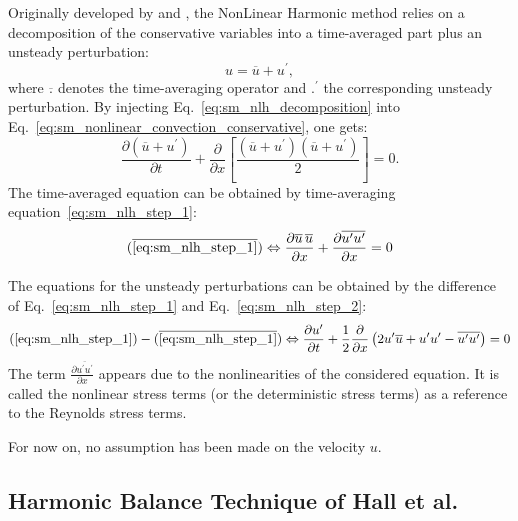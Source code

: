 Originally developed by \citet{He1998} and \citet{Ning1998}, the 
NonLinear Harmonic method
relies on a decomposition of the conservative variables into a
time-averaged part plus an unsteady perturbation:
\begin{equation}
	u = \overline{u} + u^\prime,
	\label{eq:sm_nlh_decomposition}
\end{equation}
where $\overline{.}$ denotes the time-averaging operator and
$.^\prime$ the corresponding unsteady perturbation.
By injecting Eq.~\ref{eq:sm_nlh_decomposition} into
Eq.~\ref{eq:sm_nonlinear_convection_conservative}, one gets:
\begin{equation}
	\frac{\partial \left( \overline{u} + u^\prime \right)}{\partial t} + 
	\frac{\partial}{\partial x} \left[\frac{
		\left( \overline{u} + u^\prime\right)
		\left( \overline{u} + u^\prime\right)}{2}\right] = 
	0.
	\label{eq:sm_nlh_step_1}
\end{equation}
The time-averaged equation can be obtained by time-averaging
equation~\ref{eq:sm_nlh_step_1}:
\begin{equation}
	(\overline{\ref{eq:sm_nlh_step_1}})
	\Leftrightarrow
	\frac{\partial \overline{u} \, \overline{u}}{\partial x} +
	\frac{\partial \overline{u^\prime u^\prime}}{\partial x} =
	0
	\label{eq:sm_nlh_step_2}
\end{equation}

The equations for the unsteady perturbations can be obtained by
the difference of Eq.~\ref{eq:sm_nlh_step_1}
and Eq.~\ref{eq:sm_nlh_step_2}:
\begin{equation}
	(\ref{eq:sm_nlh_step_1}) - (\overline{\ref{eq:sm_nlh_step_1}})
	\Leftrightarrow
	\frac{\partial u^\prime}{\partial t} +
	\frac{1}{2} \frac{\partial}{\partial x} \left(
		2 u^\prime \overline{u} + 
		u^\prime u^\prime - 
		\overline{u^\prime u^\prime}\right) =
	0
	\label{eq:sm_nlh_step_3}
\end{equation}
The term $\frac{\partial \overline{u^\prime u^\prime}}{\partial x}$
appears due to the nonlinearities of the considered equation. It
is called the nonlinear stress terms 
(or the deterministic stress terms) as a reference to 
the Reynolds stress terms. 

For now on, no assumption has been made on the velocity $u$.

\subsection{Harmonic Balance Technique of Hall et al.} %
\label{sub:harmonic_balance_technique_of_hall}

